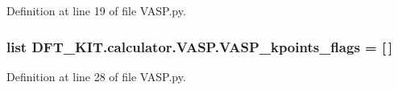 Definition at line 19 of file V\+A\+S\+P.\+py.

\hypertarget{namespace_d_f_t___k_i_t_1_1calculator_1_1_v_a_s_p_a5f56b24ad81644827a028dd152578ba0}{
\subsubsection[{V\+A\+S\+P\+\_\+kpoints\+\_\+flags}]{\setlength{\rightskip}{0pt plus 5cm}list D\+F\+T\+\_\+\+K\+I\+T.\+calculator.\+V\+A\+S\+P.\+V\+A\+S\+P\+\_\+kpoints\+\_\+flags = \mbox{[}$\,$\mbox{]}}}\label{namespace_d_f_t___k_i_t_1_1calculator_1_1_v_a_s_p_a5f56b24ad81644827a028dd152578ba0}


Definition at line 28 of file V\+A\+S\+P.\+py.

